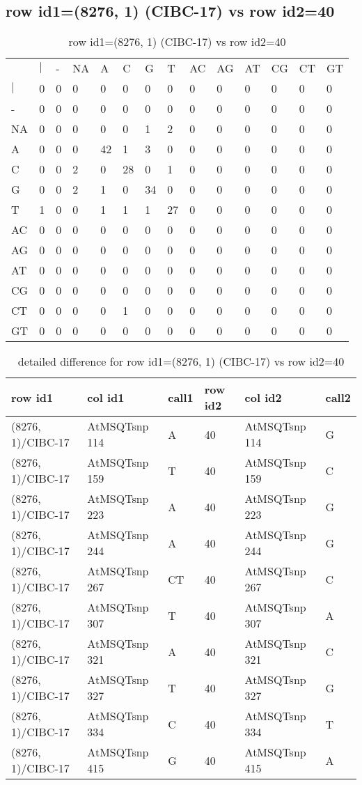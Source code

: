 \subsection{row id1=(8276, 1) (CIBC-17) vs row id2=40}
\begin{center}
\begin{longtable}{|l|l|l|l|l|l|l|l|l|l|l|l|l|l|}
\caption{row id1=(8276, 1) (CIBC-17) vs row id2=40} \label{table_dm430}\\
\hline
\\
\hline
&$|$&-&NA&A&C&G&T&AC&AG&AT&CG&CT&GT\\
$|$&0&0&0&0&0&0&0&0&0&0&0&0&0\\
-&0&0&0&0&0&0&0&0&0&0&0&0&0\\
NA&0&0&0&0&0&1&2&0&0&0&0&0&0\\
A&0&0&0&42&1&3&0&0&0&0&0&0&0\\
C&0&0&2&0&28&0&1&0&0&0&0&0&0\\
G&0&0&2&1&0&34&0&0&0&0&0&0&0\\
T&1&0&0&1&1&1&27&0&0&0&0&0&0\\
AC&0&0&0&0&0&0&0&0&0&0&0&0&0\\
AG&0&0&0&0&0&0&0&0&0&0&0&0&0\\
AT&0&0&0&0&0&0&0&0&0&0&0&0&0\\
CG&0&0&0&0&0&0&0&0&0&0&0&0&0\\
CT&0&0&0&0&1&0&0&0&0&0&0&0&0\\
GT&0&0&0&0&0&0&0&0&0&0&0&0&0\\
\hline
\end{longtable}
\end{center}

\begin{center}
\begin{longtable}{|l|l|l|l|l|l|}
\caption{detailed difference for row id1=(8276, 1) (CIBC-17) vs row id2=40} \label{table_dm431}\\
\hline
row id1&col id1&call1&row id2&col id2&call2\\
\hline
(8276, 1)/CIBC-17&AtMSQTsnp 114&A&40&AtMSQTsnp 114&G\\
(8276, 1)/CIBC-17&AtMSQTsnp 159&T&40&AtMSQTsnp 159&C\\
(8276, 1)/CIBC-17&AtMSQTsnp 223&A&40&AtMSQTsnp 223&G\\
(8276, 1)/CIBC-17&AtMSQTsnp 244&A&40&AtMSQTsnp 244&G\\
(8276, 1)/CIBC-17&AtMSQTsnp 267&CT&40&AtMSQTsnp 267&C\\
(8276, 1)/CIBC-17&AtMSQTsnp 307&T&40&AtMSQTsnp 307&A\\
(8276, 1)/CIBC-17&AtMSQTsnp 321&A&40&AtMSQTsnp 321&C\\
(8276, 1)/CIBC-17&AtMSQTsnp 327&T&40&AtMSQTsnp 327&G\\
(8276, 1)/CIBC-17&AtMSQTsnp 334&C&40&AtMSQTsnp 334&T\\
(8276, 1)/CIBC-17&AtMSQTsnp 415&G&40&AtMSQTsnp 415&A\\
\hline
\end{longtable}
\end{center}


